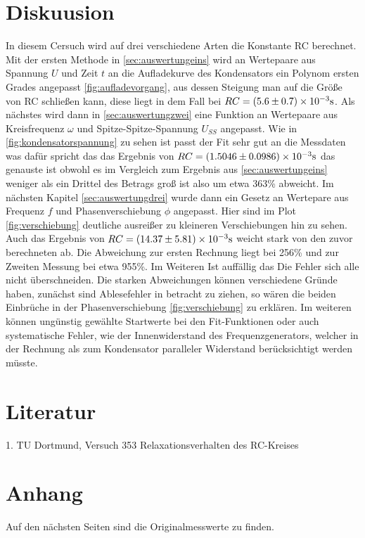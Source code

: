\section{Diskuusion}
In diesem Cersuch wird auf drei verschiedene Arten die Konstante RC berechnet. Mit der
ersten Methode in \autoref{sec:auswertungeins} wird an Wertepaare aus Spannung $U$ und Zeit
$t$ an die Aufladekurve des Kondensators ein Polynom ersten Grades angepasst \autoref{fig:aufladevorgang}, aus dessen Steigung
man auf die Größe von RC schließen kann, diese liegt in dem Fall bei $RC=(5.6\pm0.7)\times 10^{-3}\si[]{s}$. Als nächstes
wird dann in \autoref{sec:auswertungzwei} eine Funktion an Wertepaare aus Kreisfrequenz $\omega$ und Spitze-Spitze-Spannung $U_{SS}$
angepasst. Wie in \autoref{fig:kondensatorspannung} zu sehen ist passt der Fit sehr gut an die Messdaten was dafür spricht das das
Ergebnis von $RC=(1.5046 \pm 0.0986)\times 10^{-3}\si[]{s}$ das genauste ist obwohl es im Vergleich zum Ergebnis aus \autoref{sec:auswertungeins}
weniger als ein Drittel des Betrags groß ist also um etwa 363\% abweicht. Im nächsten Kapitel \autoref{sec:auswertungdrei} wurde dann ein Gesetz an 
Wertepare aus Frequenz $f$ und Phasenverschiebung $\phi$ angepasst. Hier sind im Plot \autoref{fig:verschiebung} deutliche ausreißer zu kleineren 
Verschiebungen hin zu sehen. Auch das Ergebnis von  $RC=(14.37 \pm 5.81)\times10^{-3}\si[]{s}$ weicht stark von den zuvor berechneten ab.
Die Abweichung zur ersten Rechnung liegt bei 256\% und zur Zweiten Messung bei etwa 955\%. Im Weiteren Ist auffällig das Die Fehler sich alle 
nicht überschneiden.  
Die starken Abweichungen können verschiedene Gründe haben, zunächst sind Ablesefehler
in betracht zu ziehen, so wären die beiden Einbrüche in der Phasenverschiebung \autoref{fig:verschiebung}
zu erklären. Im weiteren können ungünstig gewählte Startwerte bei den Fit-Funktionen oder auch systematische
Fehler, wie der Innenwiderstand des Frequenzgenerators, welcher in der Rechnung  als zum Kondensator paralleler
Widerstand berücksichtigt werden müsste. 

\section{Literatur}
1. TU Dortmund, Versuch 353 Relaxationsverhalten des RC-Kreises\\

\section{Anhang}
Auf den nächsten Seiten sind die Originalmesswerte zu finden.

